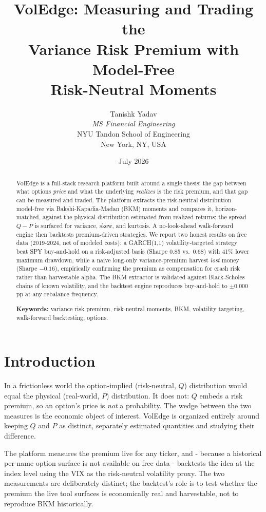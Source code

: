 \documentclass[11pt]{article}
\title{\textbf{VolEdge: Measuring and Trading the\\Variance Risk Premium with Model-Free\\Risk-Neutral Moments}}
\author{Tanishk Yadav\\[2pt]\textit{MS Financial Engineering}\\NYU Tandon School of Engineering\\New York, NY, USA}
\date{July 2026}
\begin{document}
\maketitle
\thispagestyle{fancy}

\begin{abstract}
\noindent
VolEdge is a full-stack research platform built around a single thesis: the gap
between what options \emph{price} and what the underlying \emph{realizes} is the
risk premium, and that gap can be measured and traded. The platform extracts the
risk-neutral distribution model-free via Bakshi-Kapadia-Madan (BKM) moments and
compares it, horizon-matched, against the physical distribution estimated from
realized returns; the spread $Q-P$ is surfaced for variance, skew, and kurtosis.
A no-look-ahead walk-forward engine then backtests premium-driven strategies.
We report two honest results on free data (2019-2024, net of modeled costs):
a GARCH(1,1) volatility-targeted strategy beat SPY buy-and-hold on a risk-adjusted
basis (Sharpe 0.85 vs.\ 0.68) with 41\% lower maximum drawdown, while a naive
long-only variance-premium harvest \emph{lost} money (Sharpe $-0.16$), empirically
confirming the premium as compensation for crash risk rather than harvestable
alpha. The BKM extractor is validated against Black-Scholes chains of known
volatility, and the backtest engine reproduces buy-and-hold to $\pm 0.000$ pp at
any rebalance frequency.

\medskip
\noindent\textbf{Keywords:} variance risk premium, risk-neutral moments, BKM,
volatility targeting, walk-forward backtesting, options.
\end{abstract}

\section{Introduction}

In a frictionless world the option-implied (risk-neutral, $Q$) distribution would
equal the physical (real-world, $P$) distribution. It does not: $Q$ embeds a risk
premium, so an option's price is \emph{not} a probability. The wedge between the
two measures is the economic object of interest. VolEdge is organized entirely
around keeping $Q$ and $P$ as distinct, separately estimated quantities and
studying their difference.

The platform measures the premium live for any ticker, and - because a historical
per-name option surface is not available on free data - backtests the idea at the
index level using the VIX as the risk-neutral volatility proxy. The two
measurements are deliberately distinct; the backtest's role is to test whether the
premium the live tool surfaces is economically real and harvestable, not to
reproduce BKM historically.
\end{document}
